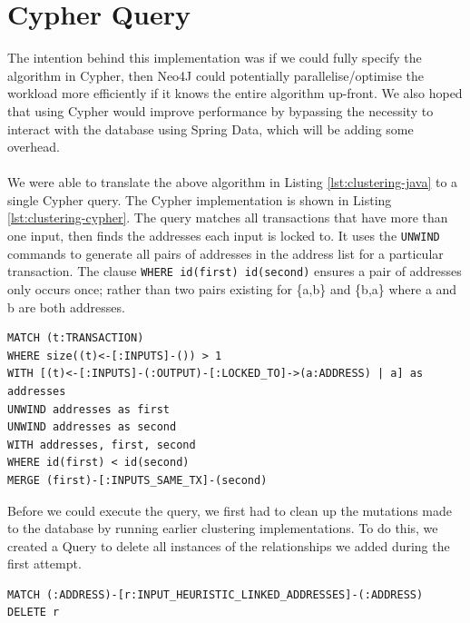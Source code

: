 \section{Cypher Query}
The intention behind this implementation was if we could fully specify the algorithm in Cypher, then Neo4J could potentially parallelise/optimise the workload more efficiently if it knows the entire algorithm up-front. We also hoped that using Cypher would improve performance by bypassing the necessity to interact with the database using Spring Data, which will be adding some overhead. 
\\\\
We were able to translate the above algorithm in Listing \ref{lst:clustering-java} to a single Cypher query. The Cypher implementation is shown in Listing \ref{lst:clustering-cypher}.
The query matches all transactions that have more than one input, then finds the addresses each input is locked to. It uses the \texttt{UNWIND} commands to generate all pairs of addresses in the address list for a particular transaction. The clause \texttt{WHERE id(first) \< id(second)} ensures a pair of addresses only occurs once; rather than two pairs existing for \{a,b\} and \{b,a\} where a and b are both addresses.

\begin{lstlisting}[caption={Cypher Implementation}, label={lst:clustering-cypher}, breaklines=true, basicstyle=\small]
MATCH (t:TRANSACTION)
WHERE size((t)<-[:INPUTS]-()) > 1
WITH [(t)<-[:INPUTS]-(:OUTPUT)-[:LOCKED_TO]->(a:ADDRESS) | a] as addresses
UNWIND addresses as first
UNWIND addresses as second
WITH addresses, first, second
WHERE id(first) < id(second)
MERGE (first)-[:INPUTS_SAME_TX]-(second)
\end{lstlisting}

Before we could execute the query, we first had to clean up the mutations made to the database by running earlier clustering implementations. To do this, we created a Query to delete all instances of the relationships we added during the first attempt. 
\begin{lstlisting}
MATCH (:ADDRESS)-[r:INPUT_HEURISTIC_LINKED_ADDRESSES]-(:ADDRESS)
DELETE r
\end{lstlisting}

